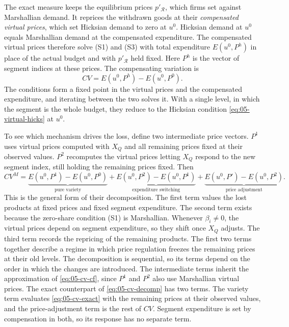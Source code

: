 The exact measure keeps the equilibrium prices $p'_{\mathcal{R}}$, which firms set against Marshallian demand. It
reprices the withdrawn goods at their \emph{compensated virtual prices}, which set Hicksian demand to zero at
$u^0$. Hicksian demand at $u^0$ equals Marshallian demand at the compensated expenditure. The compensated
virtual prices therefore solve (S1) and (S3) with total expenditure $E(u^0,P^h)$ in place of the actual budget
and with $p'_{\mathcal{R}}$ held fixed. Here $P^h$ is the vector of segment indices at these prices. The
compensating variation is
\begin{equation}\label{eq:05-cv-exact}
  CV = E(u^0,P^h) - E(u^0,P^0).
\end{equation}
The conditions form a fixed point in the virtual prices and the compensated expenditure, and iterating between
the two solves it. With a single level, in which the segment is the whole budget, they reduce to the Hicksian
condition \eqref{eq:05-virtual-hicks} at $u^0$.

To see which mechanism drives the loss, \citet{ChaudhuriGoldbergJia2006} define two intermediate price vectors.
$P^1$ uses virtual prices computed with $X_Q$ and all remaining prices fixed at their observed values. $P^2$
recomputes the virtual prices letting $X_Q$ respond to the new segment index, still holding the remaining prices
fixed. Then
\begin{equation}\label{eq:05-cv-decomp}
  CV^M = \underbrace{E(u^0,P^1) - E(u^0,P^0)}_{\text{pure variety}}
  + \underbrace{E(u^0,P^2) - E(u^0,P^1)}_{\text{expenditure switching}}
  + \underbrace{E(u^0,P') - E(u^0,P^2)}_{\text{price adjustment}}.
\end{equation}
This is the general form of their decomposition. The first term values the lost products at fixed prices and
fixed segment expenditure. The second term exists because the zero-share condition (S1) is Marshallian. Whenever
$\beta_i \neq 0$, the virtual prices depend on segment expenditure, so they shift once $X_Q$ adjusts. The third
term records the repricing of the remaining products. The first two terms together describe a regime in which
price regulation freezes the remaining prices at their old levels. The decomposition is sequential, so its terms
depend on the order in which the changes are introduced. The intermediate terms inherit the approximation of
\eqref{eq:05-cv-cf}, since $P^1$ and $P^2$ also use Marshallian virtual prices. The exact counterpart of
\eqref{eq:05-cv-decomp} has two terms. The variety term evaluates \eqref{eq:05-cv-exact} with the remaining
prices at their observed values, and the price-adjustment term is the rest of $CV$. Segment expenditure is set
by compensation in both, so its response has no separate term.

